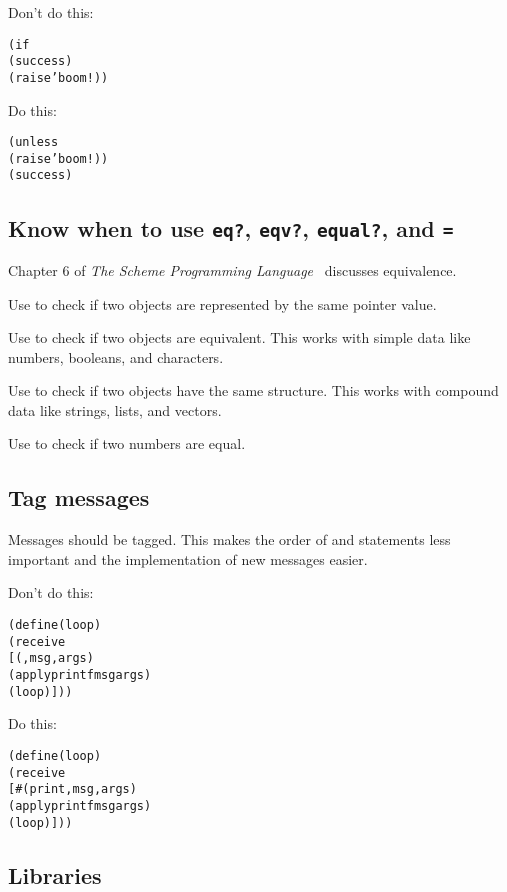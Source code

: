 \documentclass[letterpaper,11pt,twoside,final]{article}
\begin{document}
Don't do this:
\antipar
\begin{alltt}
(if 
    (success)
    (raise 'boom!))
\end{alltt}

Do this:
\antipar
\begin{alltt}
(unless 
  (raise 'boom!))
(success)
\end{alltt}

\subsection* {Know when to use \texttt{eq?}, \texttt{eqv?},
  \texttt{equal?}, and \texttt{=}}

Chapter 6 of \emph{The Scheme Programming
  Language}~\cite{the-scheme-programming-language} discusses
equivalence.

Use  to check if two objects are represented by the same
pointer value.

Use  to check if two objects are equivalent. This works
with simple data like numbers, booleans, and characters.

Use  to check if two objects have the same
structure. This works with compound data like strings, lists, and
vectors.

Use \code{=} to check if two numbers are equal.

\subsection* {Tag messages}

Messages should be tagged. This makes the order of 
and  statements less important and the implementation of
new messages easier.

Don't do this:
\antipar
\begin{alltt}
(define (loop)
  (receive
   [(,msg ,args)
    (apply printf msg args)
    (loop)]))
\end{alltt}

Do this:
\antipar
\begin{alltt}
(define (loop)
  (receive
   [\#(print ,msg ,args)
    (apply printf msg args)
    (loop)]))
\end{alltt}

\subsection* {Libraries}
\end{document}
